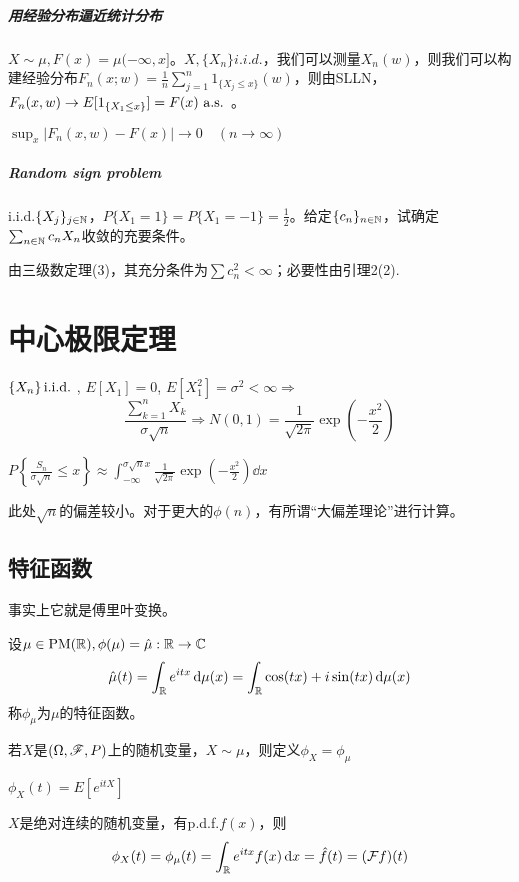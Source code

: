 \documentclass{ctexbook}
\begin{document}
\paragraph{用经验分布逼近统计分布}
$X\sim\mu, F(x)=\mu(-\infty,x]$。$X,\{X_{n}\}i.i.d.$，我们可以测量$X_{n}(w)$，则我们可以构建经验分布$F_{n}(x;w)=\frac{1}{n}\sum_{j=1}^{n}1_{\{X_{j}\leq x\}}(w)$，则由SLLN，$F_{n}(x,w)\to E[1_{\{X_{1}\leq x\}}]=
F(x)\text{ a.s. }$。

\begin{Prop}
  $\sup_{x}|F_{n}(x,w)-F(x)|\to 0\quad (n\to\infty)$
\end{Prop}

\paragraph{Random sign problem}
i.i.d.$\{X_{j}\}_{j\in\mathbb{N}}$，$P\{X_{1}=1\}=P\{X_{1}=-1\}=\frac{1}{2}$。给定$\{c_{n}\}_{n\in\mathbb{N}}$，试确定$\sum_{n\in\mathbb{N}}c_{n}X_{n}$收敛的充要条件。

由三级数定理(3)，其充分条件为$\sum c_{n}^{2}<\infty$；必要性由引理2(2).

\chapter{中心极限定理}
\begin{Eg}
  $\left\{ X_n \right\}\mathrm{i.i.d.}~$, $E[X_1]=0$, $E[X_1^2]=\sigma^2<\infty\Rightarrow$
\begin{equation}
\frac{\sum_{k=1}^nX_k}{\sigma \sqrt{n}}\Rightarrow N \left( 0,1 \right)=\frac{1}{\sqrt{2\pi}}\exp(-\frac{x^2}{2})
\end{equation}
\end{Eg}

$P \left\{ \frac{S_n}{\sigma \sqrt{n}}\leq x \right\}\approx \int_{-\infty}^{\sigma \sqrt{n}x}\frac{1}{\sqrt{2\pi}}\exp(-\frac{x^2}{2})\dd x$

此处$\sqrt{n}$的偏差较小。对于更大的$\phi(n)$，有所谓“大偏差理论”进行计算。

\section{特征函数}
事实上它就是傅里叶变换。
\begin{Def}
  设$\mu\in \mathrm{PM}(\mathbb{R}), \phi(\mu)=\hat{\mu}:\mathbb{R}\to \mathbb{C}$ 
\begin{equation}
\hat{\mu}(t)=\int_{\mathbb{R}}e^{itx}\,\mathrm{d}\mu(x)=\int_{\mathbb{R}}\cos(tx)+i\sin(tx)\,\mathrm{d}\mu(x)
\end{equation}
称$\phi_{\mu}$为$\mu$的特征函数。
\end{Def}
\begin{Rmk}
  若$X$是$\left( \Omega,\mathscr{F},P \right)$上的随机变量，$X\sim\mu$，则定义$\phi_X=\phi_{\mu}$
\end{Rmk}
\begin{Rmk}
  $\phi_X(t)=E \left[ e^{itX} \right]$
\end{Rmk}
\begin{Rmk}
  $X$是绝对连续的随机变量，有p.d.f.$f(x)$，则
\begin{equation}
\phi_X(t)=\phi_{\mu}(t)=\int_{\mathbb{R}}e^{itx}f(x)\,\mathrm{d} x=\hat{f}(t)=(\mathcal{F}f)(t)
\end{equation}
\end{Rmk}
\end{document}
